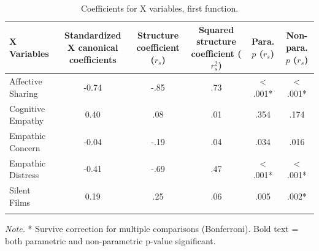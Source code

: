 \documentclass[
  english,
  man,floatsintext]{apa6}
\begin{document}
\begin{table}[tbp]

\begin{center}
\begin{threeparttable}

\caption{\label{tab:alt2_coeffxtable}Coefficients for X variables, first function.}

\small{

\begin{tabular}{lccccc}
\toprule
X Variables & Standardized X canonical coefficients & Structure coefficient ($r_{s}$) & Squared structure coefficient ($r^{2}_{s}$) & Para. $p$ ($r_{s}$) & Non-para. $p$ ($r_{s}$)\\
\midrule
Affective Sharing & -0.74 & -.85 & .73 & < .001* & < .001*\\
Cognitive Empathy & 0.40 & .08 & .01 & .354 & .174\\
Empathic Concern & -0.04 & -.19 & .04 & .034 & .016\\
Empathic Distress & -0.41 & -.69 & .47 & < .001* & < .001*\\
Silent Films & 0.19 & .25 & .06 & .005 & .002*\\
\bottomrule
\addlinespace
\end{tabular}

}

\begin{tablenotes}[para]
\normalsize{\textit{Note.} * Survive correction for multiple comparisons (Bonferroni). Bold text = both 
          parametric and non-parametric p-value significant.}
\end{tablenotes}

\end{threeparttable}
\end{center}

\end{table}
\end{document}
